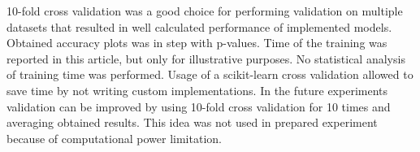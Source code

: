 \documentclass[a4paper, 10 pt, journal]{ieeeconf}
\begin{document}
10-fold cross validation was a good choice for performing validation on multiple datasets that resulted in well calculated performance of implemented models. Obtained accuracy plots was in step with p-values.  Time of the training was reported in this article, but only for illustrative purposes. No statistical analysis of training time was performed. Usage of a scikit-learn cross validation allowed to save time by not writing custom implementations. In the future experiments validation can be improved by using 10-fold cross validation for 10 times and averaging obtained results. This idea was not used in prepared experiment because of computational power limitation.






\end{document}
